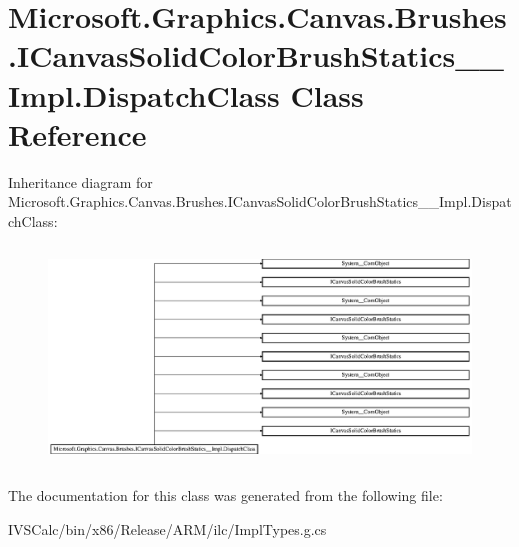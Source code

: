 \hypertarget{class_microsoft_1_1_graphics_1_1_canvas_1_1_brushes_1_1_i_canvas_solid_color_brush_statics_____impl_1_1_dispatch_class}{}\section{Microsoft.\+Graphics.\+Canvas.\+Brushes.\+I\+Canvas\+Solid\+Color\+Brush\+Statics\+\_\+\+\_\+\+Impl.\+Dispatch\+Class Class Reference}
\label{class_microsoft_1_1_graphics_1_1_canvas_1_1_brushes_1_1_i_canvas_solid_color_brush_statics_____impl_1_1_dispatch_class}
Inheritance diagram for Microsoft.\+Graphics.\+Canvas.\+Brushes.\+I\+Canvas\+Solid\+Color\+Brush\+Statics\+\_\+\+\_\+\+Impl.\+Dispatch\+Class\+:\begin{figure}[H]
\begin{center}
\leavevmode
\includegraphics[height=5.877862cm]{class_microsoft_1_1_graphics_1_1_canvas_1_1_brushes_1_1_i_canvas_solid_color_brush_statics_____impl_1_1_dispatch_class}
\end{center}
\end{figure}


The documentation for this class was generated from the following file\+:\begin{DoxyCompactItemize}
\item 
I\+V\+S\+Calc/bin/x86/\+Release/\+A\+R\+M/ilc/Impl\+Types.\+g.\+cs\end{DoxyCompactItemize}
